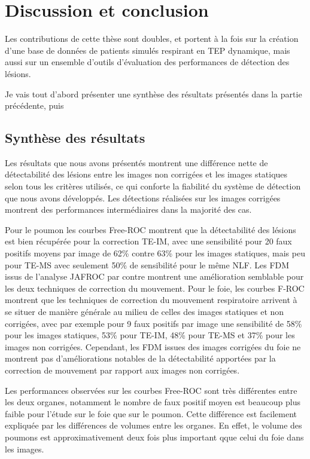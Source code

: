 \chapter{Discussion et conclusion}

Les contributions de cette thèse sont doubles, et portent à la fois sur la
création d'une base de données de patients simulés respirant en TEP dynamique, 
mais aussi sur un ensemble d'outils d'évaluation des performances de détection
des lésions.  
 
Je vais tout d'abord présenter une synthèse des résultats présentés dans la
partie précédente, puis 

\section{Synthèse des résultats}

Les résultats que nous avons présentés montrent une différence nette de
détectabilité des lésions entre les images non corrigées et les images statiques
selon tous les critères utilisés, ce qui conforte la fiabilité du système de
détection que nous avons développés. Les détections réalisées sur les images
corrigées montrent des performances intermédiaires dans la majorité des cas. 

Pour le poumon les courbes Free-ROC montrent que la détectabilité des
lésions est bien récupérée pour la correction TE-IM, avec une sensibilité pour
20 faux positifs moyens par image de 62\% contre 63\% pour les images statiques,
mais peu pour TE-MS avec seulement 50\% de sensibilité pour le même NLF. Les FDM
issus de l'analyse JAFROC par contre montrent une amélioration semblable pour
les deux techniques de correction du mouvement. Pour le foie, les courbes F-ROC
montrent que les techniques de correction du mouvement respiratoire arrivent à
se situer de manière générale au milieu de celles des images statiques et non
corrigées, avec par exemple pour 9 faux positifs par image une sensibilité de
58\% pour les images statiques, 53\% pour TE-IM, 48\% pour TE-MS et 37\% pour
les images non corrigées. Cependant, les FDM issues des images corrigées du foie
ne montrent pas d'améliorations notables de la détectabilité apportées par la
correction de mouvement par rapport aux images non corrigées. 

Les performances observées sur les courbes Free-ROC sont très différentes
 entre les deux organes, notamment le nombre de faux positif moyen est
beaucoup plus faible pour l'étude sur le foie que sur le poumon. Cette
différence est facilement expliquée par les différences de volumes entre les
organes. En effet, le volume des poumons est approximativement deux fois plus
important qque celui du foie dans les images.

